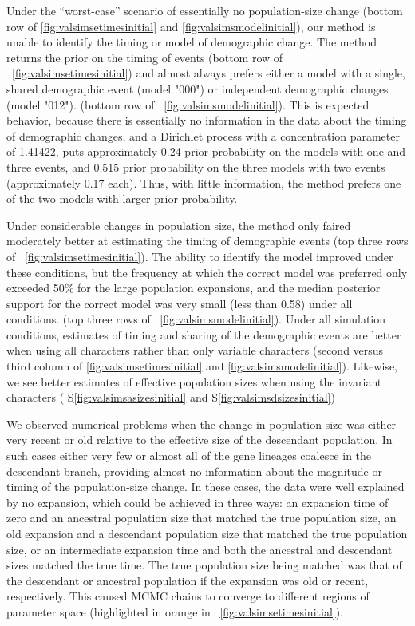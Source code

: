 Under the ``worst-case'' scenario of essentially no population-size change
(bottom row of \figs \ref{fig:valsimsetimesinitial} and
\ref{fig:valsimsmodelinitial}), our method is unable to identify the timing or
model of demographic change.
The method returns the prior on the timing of events 
(bottom row of \fig{}~\ref{fig:valsimsetimesinitial})
and almost always prefers either a model with a single, shared demographic
event (model "000") or independent demographic changes (model "012").
(bottom row of \fig{}~\ref{fig:valsimsmodelinitial}).
This is expected behavior, because there is essentially no information in the
data about the timing of demographic changes, and a Dirichlet process with a
concentration parameter of 1.41422, puts approximately 0.24 prior probability
on the models with one and three events, and 0.515 prior probability on the
three models with two events (approximately 0.17 each).
Thus, with little information, the method prefers one of the two models with
larger prior probability.

Under considerable changes in population size, the method only faired
moderately better at estimating the timing of demographic events
(top three rows of \fig{}~\ref{fig:valsimsetimesinitial}).
The ability to identify the model improved under these
conditions, but the frequency at which the correct model
was preferred only exceeded 50\% for the large population
expansions, and the median posterior support for the correct
model was very small (less than 0.58) under all conditions.
(top three rows of \fig{}~\ref{fig:valsimsmodelinitial}).
Under all simulation conditions, estimates of timing and sharing
of the demographic events are better when using all characters
rather than only variable characters
(second versus third column of \figs
\ref{fig:valsimsetimesinitial}
and
\ref{fig:valsimsmodelinitial}).
Likewise, we see better estimates of effective population sizes when using the
invariant characters
(\figs
S\ref{fig:valsimsasizesinitial}
and
S\ref{fig:valsimsdsizesinitial})


We observed numerical problems when the change in population size was
either very recent or old relative to the effective size of the descendant
population.
In such cases either very few or almost all of the gene lineages coalesce in
the descendant branch, providing almost no information about the magnitude or
timing of the population-size change.
In these cases, the data were well explained by no expansion, which could be
achieved in three ways: an expansion time of zero and an ancestral population
size that matched the true population size, an old expansion and a
descendant population size that matched the true population size, or an
intermediate expansion time and both the ancestral and descendant sizes matched the
true time.
The true population size being matched was that of the descendant or ancestral
population if the expansion was old or recent, respectively.
This caused MCMC chains to converge to different regions of parameter
space
(highlighted in orange in \fig{}~\ref{fig:valsimsetimesinitial}).

